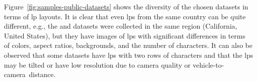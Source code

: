 \begin{table}[!htb]
\centering
\caption{The datasets used in our experiments. In this work, the ``Chinese'' layout refers to \glspl*{lp} of vehicles registered in mainland China, while the ``Taiwanese'' layout refers to \glspl*{lp} of vehicles registered in the Taiwan region.%
}
\label{tab:experiments:overview_datasets}

\vspace{-1mm}

\end{table}

Figure~\ref{fig:samples-public-datasets} shows the diversity of the chosen datasets in terms of \gls*{lp} layouts.
It is clear that even \glspl*{lp} from the same country can be quite different, e.g., the \caltech and \stills datasets were collected in the same region (California, United States), but they have images of \glspl*{lp} with significant differences in terms of colors, aspect ratios, backgrounds, and the number of characters.
It can also be observed that some datasets have \glspl*{lp} with two rows of characters and that the \glspl*{lp} may be tilted or have low resolution due to camera quality or vehicle-to-camera~distance.

